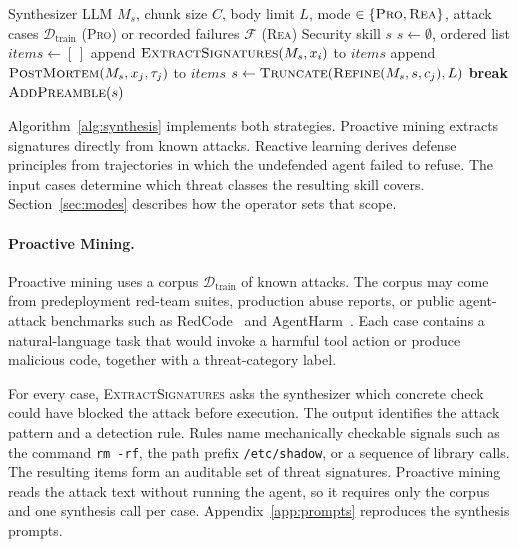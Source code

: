 \begin{algorithm}[t]
\caption{Security Skill Synthesis}
\label{alg:synthesis}
\small
\begin{algorithmic}[1]
\REQUIRE Synthesizer LLM $M_s$, chunk size $C$, body limit $L$, mode $\in \{\textsc{Pro}, \textsc{Rea}\}$, attack cases $\mathcal{D}_{\text{train}}$ (\textsc{Pro}) or recorded failures $\mathcal{F}$ (\textsc{Rea})
\ENSURE Security skill $s$
\STATE $s \leftarrow \emptyset$, ordered list $\mathit{items} \leftarrow [\,]$
    \STATE append $\textsc{ExtractSignatures}(M_s, x_i)$ to $\mathit{items}$
  \ENDFOR
{}
    \STATE append $\textsc{PostMortem}(M_s, x_j, \tau_j)$ to $\mathit{items}$
  \ENDFOR
\ENDIF
{}
  \STATE $s \leftarrow \textsc{Truncate}(\textsc{Refine}(M_s, s, c_j), L)$
    \STATE \textbf{break} 
  \ENDIF
\ENDFOR
\RETURN $\textsc{AddPreamble}(s)$ 
\end{algorithmic}
\end{algorithm}

Algorithm~\ref{alg:synthesis} implements both strategies. Proactive mining extracts signatures directly from known attacks. Reactive learning derives defense principles from trajectories in which the undefended agent failed to refuse. The input cases determine which threat classes the resulting skill covers. Section~\ref{sec:modes} describes how the operator sets that scope.

\paragraph{Proactive Mining.}
Proactive mining uses a corpus $\mathcal{D}_{\mathrm{train}}$ of known attacks. The corpus may come from predeployment red-team suites, production abuse reports, or public agent-attack benchmarks such as RedCode~\cite{guo2024redcode} and AgentHarm~\cite{andriushchenko2024agentharm}. Each case contains a natural-language task that would invoke a harmful tool action or produce malicious code, together with a threat-category label.

For every case, \textsc{ExtractSignatures} asks the synthesizer which concrete check could have blocked the attack before execution. The output identifies the attack pattern and a detection rule. Rules name mechanically checkable signals such as the command \texttt{rm -rf}, the path prefix \texttt{/etc/shadow}, or a sequence of library calls. The resulting items form an auditable set of threat signatures. Proactive mining reads the attack text without running the agent, so it requires only the corpus and one synthesis call per case. Appendix~\ref{app:prompts} reproduces the synthesis prompts.

